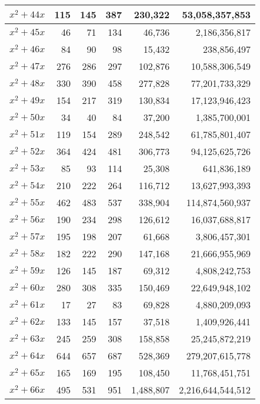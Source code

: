 \documentclass[a4paper]{amsproc}
\theoremstyle{plain}
\begin{document}
\begin{longtable}{ | l | r | r | r | r | r | }
$x^2 + 44x$ & 115 & 145 & 387 & 230{,}322 & 53{,}058{,}357{,}853 \\ \hline
$x^2 + 45x$ & 46 & 71 & 134 & 46{,}736 & 2{,}186{,}356{,}817 \\ \hline
$x^2 + 46x$ & 84 & 90 & 98 & 15{,}432 & 238{,}856{,}497 \\ \hline
$x^2 + 47x$ & 276 & 286 & 297 & 102{,}876 & 10{,}588{,}306{,}549 \\ \hline
$x^2 + 48x$ & 330 & 390 & 458 & 277{,}828 & 77{,}201{,}733{,}329 \\ \hline
$x^2 + 49x$ & 154 & 217 & 319 & 130{,}834 & 17{,}123{,}946{,}423 \\ \hline
$x^2 + 50x$ & 34 & 40 & 84 & 37{,}200 & 1{,}385{,}700{,}001 \\ \hline
$x^2 + 51x$ & 119 & 154 & 289 & 248{,}542 & 61{,}785{,}801{,}407 \\ \hline
$x^2 + 52x$ & 364 & 424 & 481 & 306{,}773 & 94{,}125{,}625{,}726 \\ \hline
$x^2 + 53x$ & 85 & 93 & 114 & 25{,}308 & 641{,}836{,}189 \\ \hline
$x^2 + 54x$ & 210 & 222 & 264 & 116{,}712 & 13{,}627{,}993{,}393 \\ \hline
$x^2 + 55x$ & 462 & 483 & 537 & 338{,}904 & 114{,}874{,}560{,}937 \\ \hline
$x^2 + 56x$ & 190 & 234 & 298 & 126{,}612 & 16{,}037{,}688{,}817 \\ \hline
$x^2 + 57x$ & 195 & 198 & 207 & 61{,}668 & 3{,}806{,}457{,}301 \\ \hline
$x^2 + 58x$ & 182 & 222 & 290 & 147{,}168 & 21{,}666{,}955{,}969 \\ \hline
$x^2 + 59x$ & 126 & 145 & 187 & 69{,}312 & 4{,}808{,}242{,}753 \\ \hline
$x^2 + 60x$ & 280 & 308 & 335 & 150{,}469 & 22{,}649{,}948{,}102 \\ \hline
$x^2 + 61x$ & 17 & 27 & 83 & 69{,}828 & 4{,}880{,}209{,}093 \\ \hline
$x^2 + 62x$ & 133 & 145 & 157 & 37{,}518 & 1{,}409{,}926{,}441 \\ \hline
$x^2 + 63x$ & 245 & 259 & 308 & 158{,}858 & 25{,}245{,}872{,}219 \\ \hline
$x^2 + 64x$ & 644 & 657 & 687 & 528{,}369 & 279{,}207{,}615{,}778 \\ \hline
$x^2 + 65x$ & 165 & 169 & 195 & 108{,}450 & 11{,}768{,}451{,}751 \\ \hline
$x^2 + 66x$ & 495 & 531 & 951 & 1{,}488{,}807 & 2{,}216{,}644{,}544{,}512 \\ \hline

\end{longtable}
\end{document}
